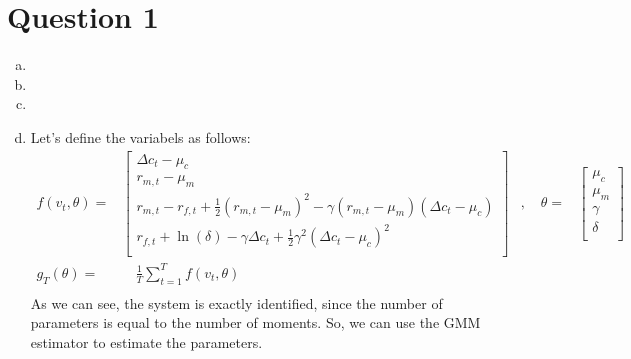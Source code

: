 
\section*{Question 1}
\begin{enumerate}[(a)]

  \item 
  \item 
  \item 
  \item Let's define the variabels as follows:
  \begin{equation*}
    \begin{aligned}
      f(v_t,\theta) = & \begin{bmatrix}
        \Delta c_t - \mu_c \\
        r_{m,t} - \mu_m \\
        r_{m,t} - r_{f,t} + \frac{1}{2} (r_{m,t} - \mu_m)^2 - \gamma (r_{m,t} - \mu_m)(\Delta c_t - \mu_c) \\
        r_{f,t} + \ln(\delta) -\gamma\Delta c_t +  \frac{1}{2}\gamma^2 (\Delta c_t - \mu_c)^2 \\
      \end{bmatrix} & , \quad 
      \theta = & \begin{bmatrix}
        \mu_c \\
        \mu_m \\
        \gamma \\
        \delta \\
      \end{bmatrix}  \\
      g_T(\theta) = & \quad \frac{1}{T} \sum_{t=1}^T f(v_t,\theta) & \\
    \end{aligned}
    \end{equation*}
    As we can see, the system is exactly identified, since the number of parameters is equal to the number of moments. So, we can use the GMM estimator to estimate the parameters.
    

\end{enumerate}
